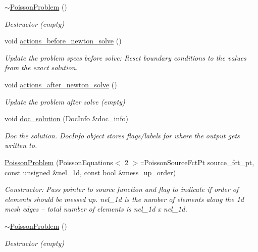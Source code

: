 \begin{DoxyCompactItemize}
\hyperlink{classPoissonProblem_ac247e42d2d292200617f4b9db7ed1ab8}{$\sim$\+Poisson\+Problem} ()
\begin{DoxyCompactList}\small\item\em Destructor (empty) \end{DoxyCompactList}\item 
void \hyperlink{classPoissonProblem_a398608a5ff73b74c5a387b3f794c58df}{actions\+\_\+before\+\_\+newton\+\_\+solve} ()
\begin{DoxyCompactList}\small\item\em Update the problem specs before solve\+: Reset boundary conditions to the values from the exact solution. \end{DoxyCompactList}\item 
void \hyperlink{classPoissonProblem_a7a9478d8e1e5c7d3a886b00ab7d50bbd}{actions\+\_\+after\+\_\+newton\+\_\+solve} ()
\begin{DoxyCompactList}\small\item\em Update the problem after solve (empty) \end{DoxyCompactList}\item 
void \hyperlink{classPoissonProblem_aab6f503fa242f687bb8452527bb7688f}{doc\+\_\+solution} (Doc\+Info \&doc\+\_\+info)
\begin{DoxyCompactList}\small\item\em Doc the solution. Doc\+Info object stores flags/labels for where the output gets written to. \end{DoxyCompactList}\item 
\hyperlink{classPoissonProblem_a63fe78758ad74469e7f6a20b4613525a}{Poisson\+Problem} (Poisson\+Equations$<$ 2 $>$\+::Poisson\+Source\+Fct\+Pt source\+\_\+fct\+\_\+pt, const unsigned \&nel\+\_\+1d, const bool \&mess\+\_\+up\+\_\+order)
\begin{DoxyCompactList}\small\item\em Constructor\+: Pass pointer to source function and flag to indicate if order of elements should be messed up. nel\+\_\+1d is the number of elements along the 1d mesh edges -- total number of elements is nel\+\_\+1d x nel\+\_\+1d. \end{DoxyCompactList}\item 
\hyperlink{classPoissonProblem_ac247e42d2d292200617f4b9db7ed1ab8}{$\sim$\+Poisson\+Problem} ()
\begin{DoxyCompactList}\small\item\em Destructor (empty) \end{DoxyCompactList}\item 

\end{DoxyCompactItemize}

